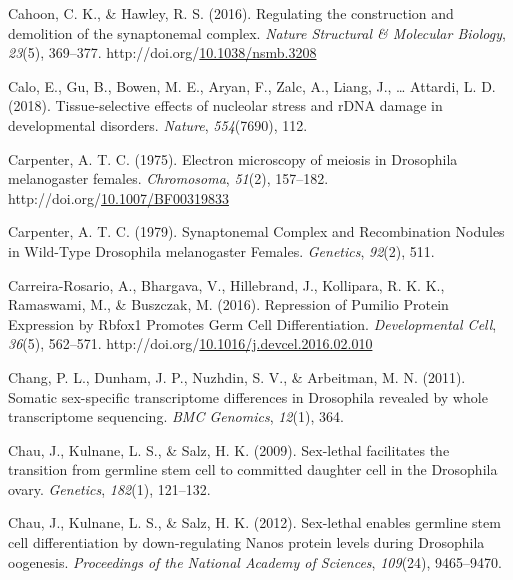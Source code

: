 \documentclass[12pt,oneside]{reedthesis}
\newlength{\cslhangindent}
\newenvironment{CSLReferences}[2] %
 {%
  \setlength{\parindent}{0pt}
  \ifodd #1 \everypar{\setlength{\hangindent}{\cslhangindent}}\ignorespaces\fi
  \ifnum #2 > 0
  \setlength{\parskip}{#2\baselineskip}
  \fi
 }%
 {}
\begin{document}
\begin{CSLReferences}{1}{0}
\leavevmode{}%
Cahoon, C. K., \& Hawley, R. S. (2016). Regulating the construction and demolition of the synaptonemal complex. \emph{Nature Structural \& Molecular Biology}, \emph{23}(5), 369--377. http://doi.org/\href{https://doi.org/10.1038/nsmb.3208}{10.1038/nsmb.3208}

\leavevmode{}%
Calo, E., Gu, B., Bowen, M. E., Aryan, F., Zalc, A., Liang, J., \ldots{} Attardi, L. D. (2018). Tissue-selective effects of nucleolar stress and {rDNA} damage in developmental disorders. \emph{Nature}, \emph{554}(7690), 112.

\leavevmode{}%
Carpenter, A. T. C. (1975). Electron microscopy of meiosis in {Drosophila} melanogaster females. \emph{Chromosoma}, \emph{51}(2), 157--182. http://doi.org/\href{https://doi.org/10.1007/BF00319833}{10.1007/BF00319833}

\leavevmode{}%
Carpenter, A. T. C. (1979). Synaptonemal {Complex} and {Recombination Nodules} in {Wild-Type Drosophila} melanogaster {Females}. \emph{Genetics}, \emph{92}(2), 511.

\leavevmode{}%
Carreira-Rosario, A., Bhargava, V., Hillebrand, J., Kollipara, R. K. K., Ramaswami, M., \& Buszczak, M. (2016). Repression of {Pumilio Protein Expression} by {Rbfox1 Promotes Germ Cell Differentiation}. \emph{Developmental Cell}, \emph{36}(5), 562--571. http://doi.org/\href{https://doi.org/10.1016/j.devcel.2016.02.010}{10.1016/j.devcel.2016.02.010}

\leavevmode{}%
Chang, P. L., Dunham, J. P., Nuzhdin, S. V., \& Arbeitman, M. N. (2011). Somatic sex-specific transcriptome differences in {Drosophila} revealed by whole transcriptome sequencing. \emph{BMC Genomics}, \emph{12}(1), 364.

\leavevmode{}%
Chau, J., Kulnane, L. S., \& Salz, H. K. (2009). Sex-lethal facilitates the transition from germline stem cell to committed daughter cell in the {Drosophila} ovary. \emph{Genetics}, \emph{182}(1), 121--132.

\leavevmode{}%
Chau, J., Kulnane, L. S., \& Salz, H. K. (2012). Sex-lethal enables germline stem cell differentiation by down-regulating {Nanos} protein levels during {Drosophila} oogenesis. \emph{Proceedings of the National Academy of Sciences}, \emph{109}(24), 9465--9470.


\end{CSLReferences}
\end{document}
